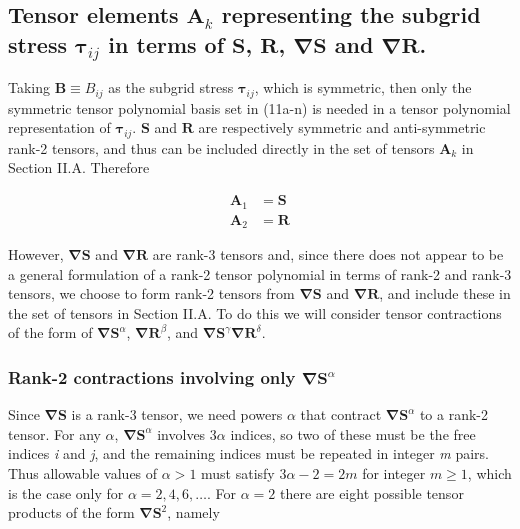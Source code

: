\subsection{Tensor elements $\mathbf{A}_k$ representing the subgrid stress $\mathbf{\tau}_{ij}$ in terms of $\mathbf{S}$, $\mathbf{R}$, $\mathbf{\nabla S}$  and $\mathbf{\nabla R}$.}

Taking  $\mathbf{B} \equiv B_{ij}$ as the subgrid stress $\mathbf{\tau}_{ij}$, which is symmetric, then only the symmetric tensor polynomial basis set in (11a-n) is needed in a tensor polynomial representation of $\mathbf{\tau}_{ij}$. $\mathbf{S}$ and $\mathbf{R}$ are respectively symmetric and anti-symmetric rank-2 tensors, and thus can be included directly in the set of tensors  $\mathbf{A}_k$ in Section II.A.  Therefore

%
\begin{subequations}
\begin{align}
	\label{E:31}
	\mathbf{A}_1 &= \mathbf{S} \\ 
	\mathbf{A}_2 &= \mathbf{R}
\end{align}
\end{subequations}
%
%    
	 
However, $\mathbf{\nabla S}$  and $\mathbf{\nabla R}$ are rank-3 tensors and, since there does not appear to be a general formulation of a rank-2 tensor polynomial in terms of rank-2 and rank-3 tensors, we choose to form rank-2 tensors from $\mathbf{\nabla S}$  and $\mathbf{\nabla R}$, and include these in the set of tensors   in Section II.A.  To do this we will consider tensor contractions of the form of $\mathbf{\nabla S}^{\alpha}$, $\mathbf{\nabla R}^{\beta}$, and $\mathbf{\nabla S}^{\gamma} \mathbf{\nabla R}^{\delta}$.


\subsubsection{Rank-2 contractions involving only $\mathbf{\nabla S}^{\alpha}$}

Since  $\mathbf{\nabla S}$ is a rank-3 tensor, we need powers  $\alpha$ that contract $\mathbf{\nabla S}^{\alpha}$  to a rank-2 tensor. For any $\alpha$,  $\mathbf{\nabla S}^{\alpha}$ involves $3\alpha$  indices, so two of these must be the free indices \textit{i} and \textit{j}, and the remaining indices must be repeated in integer \textit{m} pairs. Thus allowable values of  $\alpha > 1$ must satisfy $3\alpha - 2 = 2m$ for integer $m \geq 1$, which is the case only for $\alpha = 2,4,6, \ldots$.  For $\alpha = 2$  there are eight possible tensor products of the form $\mathbf{\nabla S}^{2}$, namely


